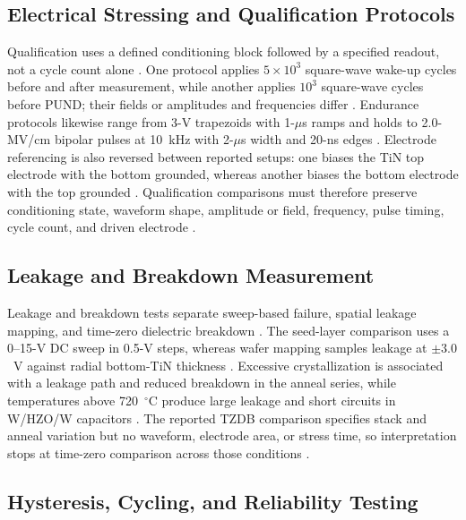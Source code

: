 \documentclass[11pt,a4paper]{report}
\begin{document}
\subsection{Electrical Stressing and Qualification Protocols}

Qualification uses a defined conditioning block followed by a specified readout, not a cycle count alone \cite{choi2025purge,liu2025zrrich,kaatranen2026unif}. One protocol applies $5\times10^3$ square-wave wake-up cycles before and after measurement, while another applies $10^3$ square-wave cycles before PUND; their fields or amplitudes and frequencies differ \cite{choi2025purge,liu2025zrrich}. Endurance protocols likewise range from 3-V trapezoids with 1-$\mu$s ramps and holds to 2.0-MV/cm bipolar pulses at 10~kHz with 2-$\mu$s width and 20-ns edges \cite{park2022chamber,choi2025purge}. Electrode referencing is also reversed between reported setups: one biases the TiN top electrode with the bottom grounded, whereas another biases the bottom electrode with the top grounded \cite{kim2020tin,liu2025zrrich}. Qualification comparisons must therefore preserve conditioning state, waveform shape, amplitude or field, frequency, pulse timing, cycle count, and driven electrode \cite{park2022chamber,choi2025purge,kim2020tin,liu2025zrrich}.
\subsection{Leakage and Breakdown Measurement}

Leakage and breakdown tests separate sweep-based failure, spatial leakage mapping, and time-zero dielectric breakdown \cite{park2023seed,kaatranen2026unif,liu2025zrrich}. The seed-layer comparison uses a 0--15-V DC sweep in 0.5-V steps, whereas wafer mapping samples leakage at $\pm3.0$~V against radial bottom-TiN thickness \cite{park2023seed,kaatranen2026unif}. Excessive crystallization is associated with a leakage path and reduced breakdown in the anneal series, while temperatures above 720~$^\circ$C produce large leakage and short circuits in W/HZO/W capacitors \cite{park2023seed,kashir2021wake}. The reported TZDB comparison specifies stack and anneal variation but no waveform, electrode area, or stress time, so interpretation stops at time-zero comparison across those conditions \cite{liu2025zrrich}.
\subsection{Hysteresis, Cycling, and Reliability Testing}
\end{document}

